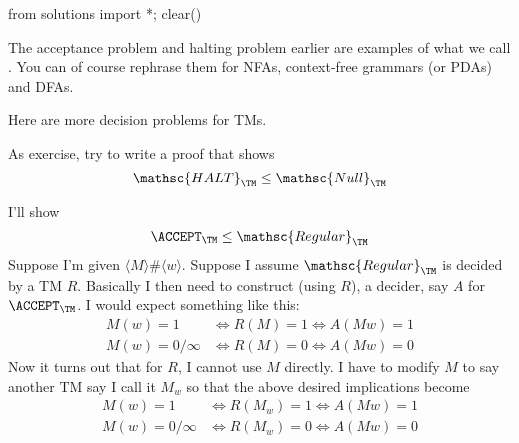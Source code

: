 \begin{python0}
from solutions import *; clear()
\end{python0}

The acceptance problem and halting problem earlier are examples
of what we call .
You can of course rephrase them for NFAs,
context-free grammars (or PDAs)
and DFAs.

Here are more decision problems for TMs.

\newcommand\SIZEONE{\mathsc{Size-One}}






\newcommand\INFINITE{\mathsc{Infinite}}


\newcommand\Null{\mathsc{Null}}


As exercise, try to write a proof that shows
\[
\mathsc{HALT}_{\TM} \leq \Null_\TM
\]

\newcommand\NULL{\mathsc{Null}}


\newcommand\ALL{\mathsc{All}}






I'll show
\[
\ACCEPT_\TM \leq \mathsc{Regular}_\TM
\]
Suppose I'm given $\langle M\rangle\#\langle w \rangle$.
Suppose I assume 
$\mathsc{Regular}_\TM$
is decided by a TM $R$.
Basically I then need to construct (using $R$), a decider, say $A$ for
$\ACCEPT_\TM$.
I would expect something like this:
\begin{align*}
M(w) = 1 &\iff R(M) = 1 \iff A(Mw) = 1 \\
M(w) = 0/\infty &\iff R(M) = 0 \iff A(Mw) = 0 
\end{align*}
Now it turns out that for $R$, I cannot use $M$ directly.
I have to modify $M$ to say another TM say I call it $M_w$ so that the
above desired implications become
\begin{align*}
M(w) = 1 &\iff R(M_w) = 1 \iff A(Mw) = 1 \\
M(w) = 0/\infty &\iff R(M_w) = 0 \iff A(Mw) = 0 
\end{align*}


